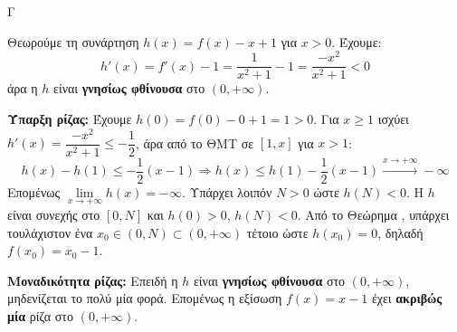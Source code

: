 \begin{thema}{Γ}
\begin{erwthma}
\item Θεωρούμε τη συνάρτηση $h(x)=f(x)-x+1$ για $x>0$. Έχουμε:
\[h'(x)=f'(x)-1=\frac{1}{x^2+1}-1=\frac{-x^2}{x^2+1}<0\]
άρα η $h$ είναι \textbf{γνησίως φθίνουσα} στο $(0,+\infty)$.

\textbf{Ύπαρξη ρίζας:} Έχουμε $h(0)=f(0)-0+1=1>0$. Για $x\geq 1$ ισχύει $h'(x)=\dfrac{-x^2}{x^2+1}\leq-\dfrac{1}{2}$, άρα από το ΘΜΤ σε $[1,x]$ για $x>1$:
\[h(x)-h(1)\leq -\frac{1}{2}(x-1)\Rightarrow h(x)\leq h(1)-\frac{1}{2}(x-1)\xrightarrow{x\to+\infty}-\infty\]
Επομένως $\lim\limits_{x\to+\infty}h(x)=-\infty$. Υπάρχει λοιπόν $N>0$ ώστε $h(N)<0$. Η $h$ είναι συνεχής στο $[0,N]$ και $h(0)>0$, $h(N)<0$. Από το Θεώρημα , υπάρχει τουλάχιστον ένα $x_0\in(0,N)\subset(0,+\infty)$ τέτοιο ώστε $h(x_0)=0$, δηλαδή $f(x_0)=x_0-1$.

\textbf{Μοναδικότητα ρίζας:} Επειδή η $h$ είναι \textbf{γνησίως φθίνουσα} στο $(0,+\infty)$, μηδενίζεται το πολύ μία φορά. Επομένως η εξίσωση $f(x)=x-1$ έχει \textbf{ακριβώς μία} ρίζα στο $(0,+\infty)$.
\end{erwthma}
\end{thema}

